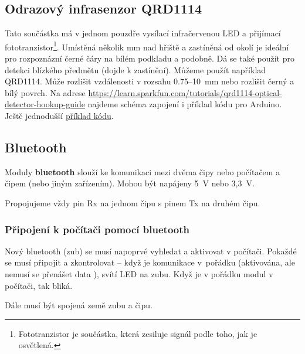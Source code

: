 \subsection{Odrazový infrasenzor QRD1114}

  \label{qrd1114} Tato součástka má v jednom pouzdře vysílací infračervenou LED a přijímací fototranzistor\footnote{Fototranzistor je součástka, která zesiluje signál podle toho, jak je osvětlená.}. Umístěná několik mm nad hřiště a zastíněná od okolí je ideální pro rozpoznázní  černé čáry na bílém podkladu a podobně. Dá se také použít pro detekci blízkého předmětu (dojde k zastínění).
Můžeme použít například QRD1114. Může rozlišit vzdálenosti v rozsahu 0.75--10~mm nebo rozlišit černý a bílý povrch.  
Na adrese
\url{https://learn.sparkfun.com/tutorials/qrd1114-optical-detector-hookup-guide} najdeme schéma zapojení i příklad kódu pro Arduino. Ještě jednodušší \hyperref[prog:qrd1114]{příklad kódu}.



\subsection{Bluetooth} 


\hypertarget{bluetooth}{} Moduly {\bf bluetooth} slouží ke komunikaci mezi dvěma čipy nebo počítačem a čipem (nebo jiným zařízením).
Mohou být napájeny 5~V nebo 3,3~V. 
\label{bluetooth} 

Propojujeme vždy pin Rx na jednom čipu s pinem Tx na druhém čipu. 

\subsubsection*{Připojení k počítači pomocí bluetooth}

Nový bluetooth (zub) se musí napoprvé vyhledat a aktivovat v počítači. 
Pokaždé se musí připojit a zkontrolovat -- když je komunikace v~pořádku (aktivována, ale nemusí se přenášet data ), svítí LED na zubu. 
Když je v pořádku modul v počítači, tak bliká.  

Dále musí být spojená země zubu a čipu.

